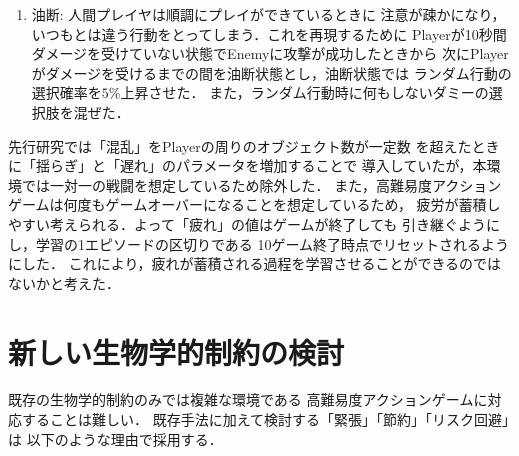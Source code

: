 \documentclass[a4paper,12pt,oneside,openany,titlepage]{jreport}
\begin{document}
\begin{enumerate}
   \item 油断: 人間プレイヤは順調にプレイができているときに
   注意が疎かになり，いつもとは違う行動をとってしまう．これを再現するために
   Playerが10秒間ダメージを受けていない状態でEnemyに攻撃が成功したときから
   次にPlayerがダメージを受けるまでの間を油断状態とし，油断状態では
   ランダム行動の選択確率を$5\%$上昇させた．
   また，ランダム行動時に何もしないダミーの選択肢を混ぜた．
 \end{enumerate}
 
 先行研究では「混乱」をPlayerの周りのオブジェクト数が一定数
 を超えたときに「揺らぎ」と「遅れ」のパラメータを増加することで
 導入していたが，本環境では一対一の戦闘を想定しているため除外した．
 また，高難易度アクションゲームは何度もゲームオーバーになることを想定しているため，
 疲労が蓄積しやすい考えられる．よって「疲れ」の値はゲームが終了しても
 引き継ぐようにし，学習の1エピソードの区切りである
 10ゲーム終了時点でリセットされるようにした．
 これにより，疲れが蓄積される過程を学習させることができるのではないかと考えた．
 
 
 \section{新しい生物学的制約の検討}
 既存の生物学的制約のみでは複雑な環境である
 高難易度アクションゲームに対応することは難しい．
 既存手法に加えて検討する「緊張」「節約」「リスク回避」は
 以下のような理由で採用する．
 
\end{document}

